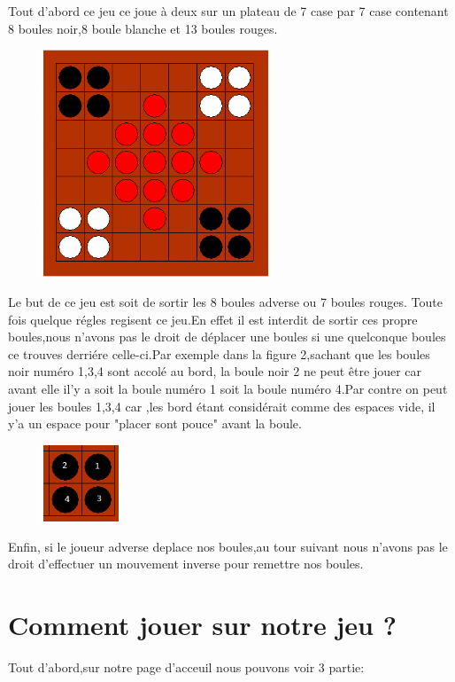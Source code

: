 \documentclass{article}
\begin{document}
Tout d'abord ce jeu ce joue à deux sur un plateau de 7 case par 7 case contenant 8 boules noir,8 boule blanche et 13 boules rouges.
\begin{figure}[!h]
\centerline{\includegraphics[width=0.6\textwidth]{images/plateau_akiba.png}}
\vspace{0.5cm}
\caption{}
\end{figure}
\newpage{}
Le but de ce jeu est soit de sortir les 8 boules adverse ou 7 boules rouges.
Toute fois quelque régles regisent ce jeu.En effet il est interdit de sortir ces propre boules,nous n'avons pas le droit de déplacer une boules si une quelconque boules ce trouves derriére celle-ci.Par exemple dans la figure 2,sachant que les boules noir numéro 1,3,4 sont accolé au bord, la boule noir 2 ne peut être jouer car avant elle il'y a soit la boule numéro 1 soit la boule numéro 4.Par contre on peut jouer les boules 1,3,4 car ,les bord étant considérait comme des espaces vide, il y'a un espace pour "placer sont pouce" avant la boule.
\begin{figure}[!h]
\centerline{\includegraphics[width=0.2\textwidth]{images/Coup_interdit.png}}
\vspace{0.5cm}
\caption{}
\end{figure}

Enfin, si le joueur adverse deplace nos boules,au tour suivant nous n'avons pas le droit d'effectuer un mouvement inverse pour remettre nos boules.


\section{Comment jouer sur notre jeu ?}
Tout d'abord,sur notre page d'acceuil nous pouvons voir 3 partie:
\end{document}
